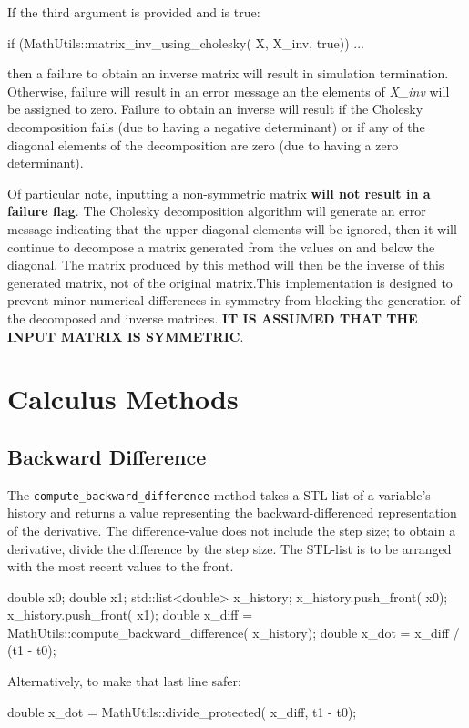 \documentclass[11pt,fleqn]{report}
\begin{document}
If the third argument is provided and is true:
\begin{code}
if (MathUtils::matrix_inv_using_cholesky( X,
X_inv,
true)) {
...
}
\end{code}
then a failure to obtain an inverse matrix will result in simulation
termination. Otherwise, failure will result in an error message an the
elements of \textit{X\_inv} will be assigned to zero. Failure to obtain an
inverse will result if the Cholesky decomposition fails (due to having a
negative determinant) or if any of the diagonal elements of the
decomposition are zero (due to having a zero determinant).

Of particular note, inputting a non-symmetric matrix \textbf{will not result
in a failure flag}. The Cholesky decomposition algorithm will generate an
error message indicating that the upper diagonal elements will be ignored,
then it will continue to decompose a matrix generated from the values on and
below the diagonal. The matrix produced by this method will then be
the inverse of this generated matrix, not of the original matrix.This
implementation is designed to prevent minor numerical differences in
symmetry from blocking the generation of the decomposed and inverse
matrices. \textbf{IT IS ASSUMED THAT THE INPUT MATRIX IS SYMMETRIC}.


\section{Calculus Methods}

\subsection{Backward Difference}
The \texttt{compute\_backward\_difference} method takes a STL-list of a 
variable's history and returns
a value representing the backward-differenced representation of the derivative.
The difference-value does not include the step size; to obtain a derivative,
divide the difference by the step size.
The STL-list is to be arranged with the most recent values to the front.

\begin{code}
double x0;
double x1;
std::list<double> x_history;
x_history.push_front( x0);
x_history.push_front( x1);
double x_diff =
MathUtils::compute_backward_difference( x_history);
double x_dot = x_diff / (t1 - t0);
\end{code}
Alternatively, to make that last line safer:
\begin{code}
double x_dot = MathUtils::divide_protected( x_diff,
t1 - t0);
\end{code}
\end{document}

